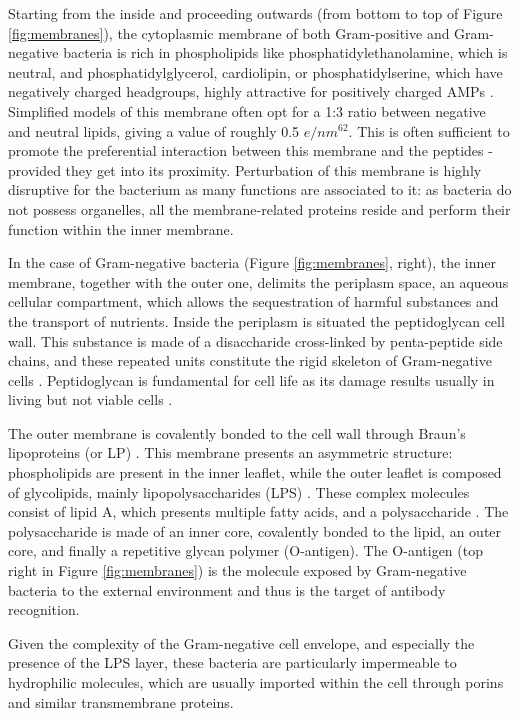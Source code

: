 Starting from the inside and proceeding outwards (from bottom to top of Figure \ref{fig:membranes}), the cytoplasmic membrane of both Gram-positive and Gram-negative bacteria is rich in phospholipids like phosphatidylethanolamine, which is neutral, and phosphatidylglycerol, cardiolipin, or phosphatidylserine, which have negatively charged headgroups, highly attractive for positively charged AMPs \citep{Silhavy2010,Lin2016}. Simplified models of this membrane often opt for a 1:3 ratio between negative and neutral lipids, giving a value of roughly 0.5 $e/nm^62$.
%
This is often sufficient to promote the preferential interaction between this membrane and the peptides - provided they get into its proximity.
%
Perturbation of this membrane is highly disruptive for the bacterium as many functions are associated to it: as bacteria do not possess organelles, all the membrane-related proteins reside and perform their function within the inner membrane.

In the case of Gram-negative bacteria (Figure \ref{fig:membranes}, right), the inner membrane, together with the outer one, delimits the periplasm space, an aqueous cellular compartment, which allows the sequestration of harmful substances and the transport of nutrients.
%
Inside the periplasm is situated the peptidoglycan cell wall. This substance is made of a disaccharide cross-linked by penta-peptide side chains, and these repeated units constitute the rigid skeleton of Gram-negative cells \citep{Gan2008}. Peptidoglycan is fundamental for cell life as its damage results usually in living but not viable cells \citep{Joseleau-Petit2007}.

The outer membrane is covalently bonded to the cell wall through Braun’s lipoproteins (or LP) \citep{Asmar2018}. This membrane presents an asymmetric structure: phospholipids are present in the inner leaflet, while the outer leaflet is composed of glycolipids, mainly lipopolysaccharides (LPS) \citep{Silhavy2010}. These complex molecules consist of lipid A, which presents multiple fatty acids, and a polysaccharide \citep{Raetz2002}. The polysaccharide is made of an inner core, covalently bonded to the lipid, an outer core, and finally a repetitive glycan polymer (O-antigen). The O-antigen (top right in Figure \ref{fig:membranes}) is the molecule exposed by Gram-negative bacteria to the external environment and thus is the target of antibody recognition.

Given the complexity of the Gram-negative cell envelope, and especially the presence of the LPS layer, these bacteria are particularly impermeable to hydrophilic molecules, which are usually imported within the cell through porins and similar transmembrane proteins.

